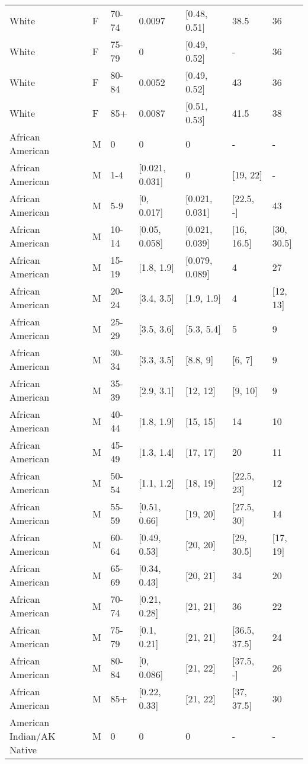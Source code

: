 \begin{table}[ht]
\begin{tabular}{lllllll}
  White & F & 70-74 & 0.0097 & [0.48, 0.51] & 38.5 & 36 \\ 
  White & F & 75-79 & 0 & [0.49, 0.52] & - & 36 \\ 
  White & F & 80-84 & 0.0052 & [0.49, 0.52] & 43 & 36 \\ 
  White & F & 85+ & 0.0087 & [0.51, 0.53] & 41.5 & 38 \\ 
  African American & M & 0 & 0 & 0 & - & - \\ 
  African American & M & 1-4 & [0.021, 0.031] & 0 & [19, 22] & - \\ 
  African American & M & 5-9 & [0, 0.017] & [0.021, 0.031] & [22.5, -] & 43 \\ 
  African American & M & 10-14 & [0.05, 0.058] & [0.021, 0.039] & [16, 16.5] & [30, 30.5] \\ 
  African American & M & 15-19 & [1.8, 1.9] & [0.079, 0.089] & 4 & 27 \\ 
  African American & M & 20-24 & [3.4, 3.5] & [1.9, 1.9] & 4 & [12, 13] \\ 
  African American & M & 25-29 & [3.5, 3.6] & [5.3, 5.4] & 5 & 9 \\ 
  African American & M & 30-34 & [3.3, 3.5] & [8.8, 9] & [6, 7] & 9 \\ 
  African American & M & 35-39 & [2.9, 3.1] & [12, 12] & [9, 10] & 9 \\ 
  African American & M & 40-44 & [1.8, 1.9] & [15, 15] & 14 & 10 \\ 
  African American & M & 45-49 & [1.3, 1.4] & [17, 17] & 20 & 11 \\ 
  African American & M & 50-54 & [1.1, 1.2] & [18, 19] & [22.5, 23] & 12 \\ 
  African American & M & 55-59 & [0.51, 0.66] & [19, 20] & [27.5, 30] & 14 \\ 
  African American & M & 60-64 & [0.49, 0.53] & [20, 20] & [29, 30.5] & [17, 19] \\ 
  African American & M & 65-69 & [0.34, 0.43] & [20, 21] & 34 & 20 \\ 
  African American & M & 70-74 & [0.21, 0.28] & [21, 21] & 36 & 22 \\ 
  African American & M & 75-79 & [0.1, 0.21] & [21, 21] & [36.5, 37.5] & 24 \\ 
  African American & M & 80-84 & [0, 0.086] & [21, 22] & [37.5, -] & 26 \\ 
  African American & M & 85+ & [0.22, 0.33] & [21, 22] & [37, 37.5] & 30 \\ 
  American Indian/AK Native & M & 0 & 0 & 0 & - & - \\ 

\end{tabular}
\end{table}
